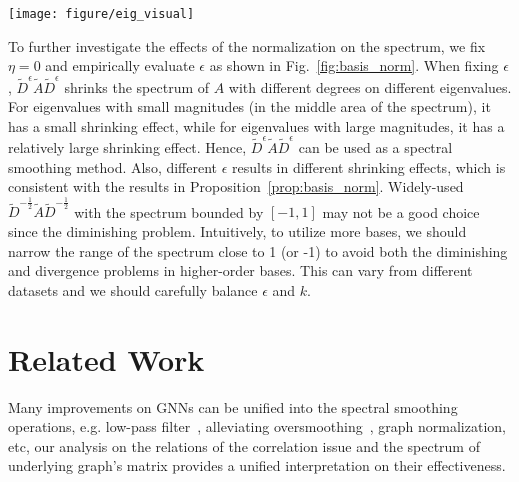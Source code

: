 \documentclass[nohyperref]{article}
\theoremstyle{plain}
\theoremstyle{definition}
\theoremstyle{remark}
\begin{document}
\begin{figure*}[th]
	\centering
	\texttt{[image: figure/eig\_visual]}
	\vspace{-20pt}
	\caption{We use the metric $\frac{\lambda_{\tilde D^{\epsilon}\tilde A\tilde D^{\epsilon}}}{\lambda_{\tilde A}}$ to evaluate the shrinking effects of $\tilde D^{\epsilon}\tilde A\tilde D^{\epsilon}$ on the spectrum. We randomly sample 5 graphs in each of three datasets ZINC, MolPCBA and NCI1 respectively. In the first three figures, we use the fixed $\epsilon=-0.3$ on all 5 graphs. In the fourth figure, we use $\epsilon=-0.1, -0.2, -0.3, -0.4, -0.5$ respectively on one graph, which corresponds to the 5 lines from top to bottom.
	More visualization results on other datasets can be found in Appendix~\ref{spectrum_visualizations}.}
	\label{fig:basis_norm}
	\vspace{-10pt}
\end{figure*}
To further investigate the effects of the normalization on the  spectrum, we fix $\eta=0$ and empirically evaluate $\epsilon$ as shown in Fig.~\ref{fig:basis_norm}.
When fixing $\epsilon$, $\tilde D^{\epsilon}\tilde A\tilde D^{\epsilon}$ shrinks the spectrum of $A$ with different degrees on different eigenvalues.
For eigenvalues with small magnitudes (in the middle area of the spectrum), it has a small shrinking effect, while for eigenvalues with large magnitudes, it has a relatively large shrinking effect.
Hence, $\tilde D^{\epsilon}\tilde A\tilde D^{\epsilon}$ can be used as a spectral smoothing method.
Also, different $\epsilon$ results in different shrinking effects, which is consistent with the results in Proposition~\ref{prop:basis_norm}.
Widely-used $\tilde D^{-\frac{1}{2}}\tilde A\tilde D^{-\frac{1}{2}}$ with the spectrum bounded by $[-1, 1]$ may not be a good choice since the diminishing problem.
Intuitively, to utilize more bases, we should narrow the range of the spectrum close to 1 (or -1) to avoid both the diminishing and divergence problems in higher-order bases.
This can vary from different datasets and we should carefully balance $\epsilon$ and $k$.

\section{Related Work}

Many improvements on GNNs can be unified into the spectral smoothing operations, e.g. low-pass filter~\cite{pmlr-v97-wu19e,zhu2021interpreting,klicpera_predict_2019,klicpera2019diffusion,chien2021adaptive,balcilar2021analyzing}, alleviating oversmoothing~\cite{chenWHDL2020gcnii,xu2018representation,liu2020towards,li2018deeper}, graph normalization\cite{cai2020graphnorm}, etc, our analysis on the relations of the correlation issue and the spectrum of underlying graph's matrix provides a unified interpretation on their effectiveness.
\end{document}
